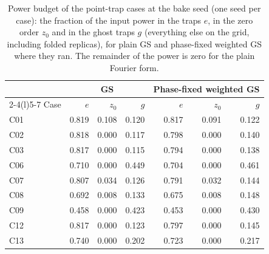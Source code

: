 \begin{table}[t]\centering\footnotesize
\caption{Power budget of the point-trap cases at the bake seed (one seed per case): the fraction of the input power in the traps $e$, in the zero order $z_0$ and in the ghost traps $g$ (everything else on the grid, including folded replicas), for plain GS and phase-fixed weighted GS where they ran. The remainder of the power is zero for the plain Fourier form.}\label{tab:power}
\begin{tabular}{@{}l r r r r r r@{}}\toprule & \multicolumn{3}{c}{GS} & \multicolumn{3}{c}{Phase-fixed weighted GS}\\
\cmidrule(lr){2-4}\cmidrule(l){5-7} Case & $e$ & $z_0$ & $g$ & $e$ & $z_0$ & $g$\\\midrule
C01 & 0.819 & 0.108 & 0.120 & 0.817 & 0.091 & 0.122\\
C02 & 0.818 & 0.000 & 0.117 & 0.798 & 0.000 & 0.140\\
C03 & 0.817 & 0.000 & 0.115 & 0.794 & 0.000 & 0.138\\
C06 & 0.710 & 0.000 & 0.449 & 0.704 & 0.000 & 0.461\\
C07 & 0.807 & 0.034 & 0.126 & 0.791 & 0.032 & 0.144\\
C08 & 0.692 & 0.008 & 0.133 & 0.675 & 0.008 & 0.148\\
C09 & 0.458 & 0.000 & 0.423 & 0.453 & 0.000 & 0.430\\
C12 & 0.817 & 0.000 & 0.123 & 0.797 & 0.000 & 0.145\\
C13 & 0.740 & 0.000 & 0.202 & 0.723 & 0.000 & 0.217\\
\bottomrule\end{tabular}\end{table}

